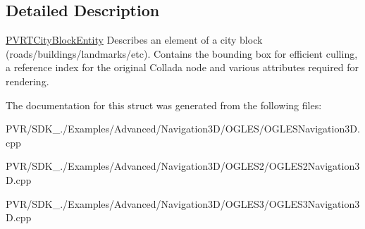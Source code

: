 \subsection{Detailed Description}


  \hyperlink{struct_p_v_r_t_city_block_entity}{P\+V\+R\+T\+City\+Block\+Entity}  Describes an element of a city block (roads/buildings/landmarks/etc). Contains the bounding box for efficient culling, a reference index for the original Collada node and various attributes required for rendering. 

The documentation for this struct was generated from the following files\+:\begin{DoxyCompactItemize}
\item 
P\+V\+R/\+S\+D\+K\+\_./\+Examples/\+Advanced/\+Navigation3\+D/\+O\+G\+L\+E\+S/O\+G\+L\+E\+S\+Navigation3\+D.\+cpp\item 
P\+V\+R/\+S\+D\+K\+\_./\+Examples/\+Advanced/\+Navigation3\+D/\+O\+G\+L\+E\+S2/O\+G\+L\+E\+S2\+Navigation3\+D.\+cpp\item 
P\+V\+R/\+S\+D\+K\+\_./\+Examples/\+Advanced/\+Navigation3\+D/\+O\+G\+L\+E\+S3/O\+G\+L\+E\+S3\+Navigation3\+D.\+cpp\end{DoxyCompactItemize}
